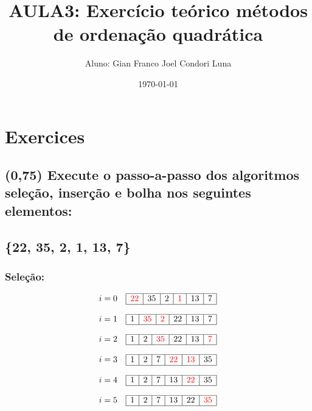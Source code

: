 \documentclass{article}
\title{AULA3: Exercício teórico métodos de ordenação quadrática}
\author{Aluno: Gian Franco Joel Condori Luna}
\date{\today}
\begin{document}
\maketitle

\section*{Exercices}
\setcounter{section}{1}
\subsection {(0,75) Execute o passo-a-passo dos algoritmos seleção, inserção e bolha nos seguintes elementos: \\
\\
\{22, 35, 2, 1, 13, 7\}}

\subsubsection{Seleção:}

\[
i = 0 \quad
\begin{array}{|c|c|c|c|c|c|}
\hline
\textcolor{red}{22} & 35 & 2 & \textcolor{red}{1} & 13 & 7 \\ 
\hline
\end{array}
\]

\[
i = 1 \quad
\begin{array}{|c|c|c|c|c|c|}
\hline
1 & \textcolor{red}{35} & \textcolor{red}{2} & 22 & 13 & 7 \\ 
\hline
\end{array}
\]

\[
i = 2 \quad
\begin{array}{|c|c|c|c|c|c|}
\hline
1 & 2 & \textcolor{red}{35} & 22 & 13 & \textcolor{red}{7} \\  
\hline
\end{array}
\]

\[
i = 3 \quad
\begin{array}{|c|c|c|c|c|c|}
\hline
1 & 2 & 7 & \textcolor{red}{22} & \textcolor{red}{13} & 35 \\  
\hline
\end{array}
\]

\[
i = 4 \quad
\begin{array}{|c|c|c|c|c|c|}
\hline
1 & 2 & 7 & 13 & \textcolor{red}{22} & 35 \\  
\hline
\end{array}
\]

\[
    i = 5 \quad
\begin{array}{|c|c|c|c|c|c|}
\hline
1 & 2 & 7 & 13 & 22 & \textcolor{red}{35} \\  
\hline
\end{array}
\]
\end{document}
